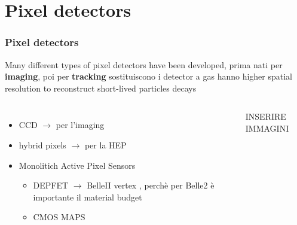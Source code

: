 \section{Pixel detectors}
    \begin{frame}
        \frametitle{Pixel detectors}
        Many different types of pixel detectors have been developed, prima nati per \textbf{imaging}, poi per \textbf{tracking} sostituiscono i detector a gas hanno higher spatial resolution to reconstruct short-lived particles decays
        \begin{columns}
                \begin{itemize}
                    \item CCD $\rightarrow$ per l'imaging
                    \item hybrid pixels $\rightarrow$ per la HEP
                    \item Monolitich Active Pixel Sensors
                    \begin{itemize}
                        \item DEPFET $\rightarrow$ BelleII vertex , perchè per Belle2 è importante il material budget
                        \item CMOS MAPS
                    \end{itemize}
                \end{itemize}
            INSERIRE IMMAGINI
        \end{columns}
    \end{frame}



